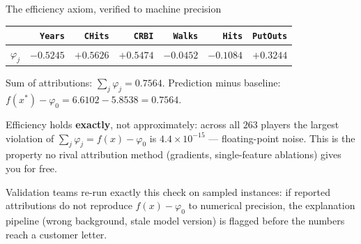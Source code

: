 \documentclass[aspectratio=169,11pt]{beamer}
\begin{document}
\begin{frame}{The efficiency axiom, verified to machine precision}
  \begin{numexample}
    \begin{center}
    \begin{tabular}{@{}lrrrrrr@{}}
      \toprule
      & \texttt{Years} & \texttt{CHits} & \texttt{CRBI} & \texttt{Walks} & \texttt{Hits} & \texttt{PutOuts} \\
      \midrule
      $\varphi_j$ & $-0.5245$ & $+0.5626$ & $+0.5474$ & $-0.0452$ & $-0.1084$ & $+0.3244$ \\
      \bottomrule
    \end{tabular}
    \end{center}
    Sum of attributions: $\sum_j \varphi_j = 0.7564$.\quad
    Prediction minus baseline: $f(x^\ast)-\varphi_0 = 6.6102-5.8538 = 0.7564$.
  \end{numexample}
  \begin{takeaway}
    Efficiency holds \textbf{exactly}, not approximately: across all $263$ players the
    largest violation of $\sum_j\varphi_j = f(x)-\varphi_0$ is $4.4\times10^{-15}$ ---
    floating-point noise. This is the property no rival attribution method
    (gradients, single-feature ablations) gives you for free.
  \end{takeaway}
  \begin{industry}
    Validation teams re-run exactly this check on sampled instances: if reported
    attributions do not reproduce $f(x)-\varphi_0$ to numerical precision, the
    explanation pipeline (wrong background, stale model version) is flagged before
    the numbers reach a customer letter.
  \end{industry}
\end{frame}
\end{document}
